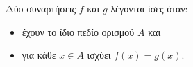 Δύο συναρτήσεις $f$ και $g$ λέγονται ίσες όταν:
\begin{itemize} 
\item έχουν το ίδιο πεδίο ορισμού $Α$ και 
\item για κάθε $x\in A$ ισχύει $f(x) = g(x)$.
\end{itemize}
